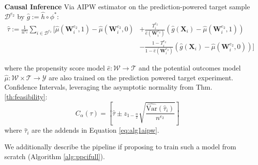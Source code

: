 \begin{algorithm*}[h!]
\begin{algorithmic}[1]
    \STATE \qquad \textbf{Causal Inference} Via AIPW estimator on the prediction-powered target sample $\mathcal{D}^{e_2}$ by $\hat{g}:=\hat{h}\circ \phi^*$:  
    \begin{equation}
    \label{eq:alg1aipw}
    \begin{split}
       \widehat{\tau} := \frac{1}{n^{e_2}} \sum_{i \in \mathcal{D}^{e_2}} \Bigg[ \widehat{\mu}(\bm{W}_i^{e_2},1) - \widehat{\mu}(\bm{W}_i^{e_2},0) 
        &+ \frac{T_i^{e_2}}{\widehat{e}(\bm{W}_i^{e_2})}  ( \hat{g}(\bm{X}_i) - %
        \widehat{\mu}(\bm{W}_i^{e_2},1) ) 
        \\ & - \frac{1-T_i^{e_2}}{1-\widehat{e}(\bm{W}_i^{e_2})} \left( \hat{g}(\bm{X}_i) - \widehat{\mu}(\bm{W}_i^{e_2},0) \right) \Bigg] 
    \end{split}
    \end{equation}

    where the propensity score model $\hat{e}: \mathcal{W}\rightarrow \mathcal{T}$ and the potential outcomes model $\hat{\mu}: \mathcal{W}\times \mathcal{T}\rightarrow \mathcal{Y}$ are also trained on the prediction powered target experiment. 
    Confidence Intervals, leveraging the asymptotic normality from Thm. \ref{th:feasibility}:
    \begin{equation}
        C_{\alpha}(\tau) = \left[\hat{\tau} \pm z_{1-\frac{\alpha}{2}} \sqrt{\frac{\widehat{\text{Var}}(\hat{\tau}_i)}{n^{e_2}}}\right]
    \end{equation}
    where $\hat{\tau}_i$ are the addends in Equation \ref{eq:alg1aipw}.
\end{algorithmic}
\end{algorithm*}

\newpage
We additionally describe the pipeline if proposing to train such a model from scratch (Algorithm \ref{alg:ppcifull}).

